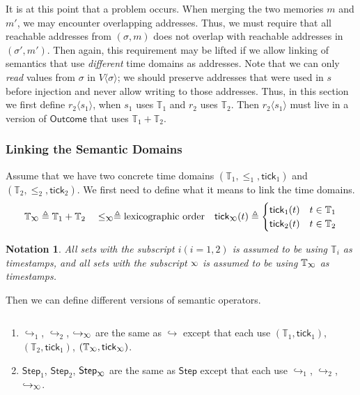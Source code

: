 \documentclass[acmsmall,screen,review]{acmart}\settopmatter{printfolios=true,printccs=false,printacmref=false}
\theoremstyle{acmdefinition}
\newtheorem*{notation*}{Notation}
\newcommand*{\Time}{\mathbb{T}}
\newcommand*{\ctx}{\sigma}
\newcommand*{\mem}{m}
\newcommand*{\Outcome}{\mathsf{Outcome}}
\newcommand*{\Step}{\mathsf{Step}}
\newcommand*{\semarrow}{\hookrightarrow}
\newcommand*{\semlink}{\mathbin{\rotatebox[origin=c]{180}{$\propto$}}}
\newcommand*{\tick}{\mathsf{tick}}
\newcommand*{\inject}[2]{{#2}\langle{#1}\rangle}
\begin{document}
It is at this point that a problem occurs.
When merging the two memories $\mem$ and $\mem'$, we may encounter overlapping addresses.
Thus, we must require that all reachable addresses from $(\ctx,\mem)$ does not overlap with reachable addresses in $(\ctx',\mem')$.
Then again, this requirement may be lifted if we allow linking of semantics that use \emph{different} time domains as addresses.
Note that we can only \emph{read} values from $\ctx$ in $\inject{\ctx}{V}$; we should preserve addresses that were used in $s$ before injection and never allow writing to those addresses.
Thus, in this section we first define $\inject{s_1}{r_2}$, when $s_1$ uses $\Time_1$ and $r_2$ uses $\Time_2$.
Then $\inject{s_1}{r_2}$ must live in a version of $\Outcome$ that uses $\Time_1+\Time_2$.

\subsubsection{Linking the Semantic Domains}
Assume that we have two concrete time domains $(\Time_1,\le_1,\tick_1)$ and $(\Time_2,\le_2,\tick_2)$.
We first need to define what it means to link the time domains.
\[
  \Time_{\semlink}\triangleq\Time_1+\Time_2\quad
  \le_{\semlink}\triangleq\text{lexicographic order}\quad
  \tick_{\semlink}(t)\triangleq
  \begin{cases}
    \tick_1(t) & t\in\Time_1 \\
    \tick_2(t) & t\in\Time_2
  \end{cases}
\]

\begin{notation*}
  All sets with the subscript $i(i=1,2)$ is assumed to be using $\Time_i$ as timestamps, and all sets with the subscript $\semlink$ is assumed to be using $\Time_{\semlink}$ as timestamps.
\end{notation*}
Then we can define different versions of semantic operators.
\begin{definition}[Versions of $\semarrow$, $\Step$]$\:$

  \begin{enumerate}
    \item $\semarrow_1$, $\semarrow_2$, $\semarrow_{\semlink}$ are the same as $\semarrow$ except that each use $(\Time_1,\tick_1)$, $(\Time_2,\tick_1)$, $(\Time_{\semlink},\tick_{\semlink})$.
    \item $\Step_1$, $\Step_2$, $\Step_{\semlink}$ are the same as $\Step$ except that each use $\semarrow_1$, $\semarrow_2$, $\semarrow_{\semlink}$.
  \end{enumerate}
\end{definition}
\end{document}
